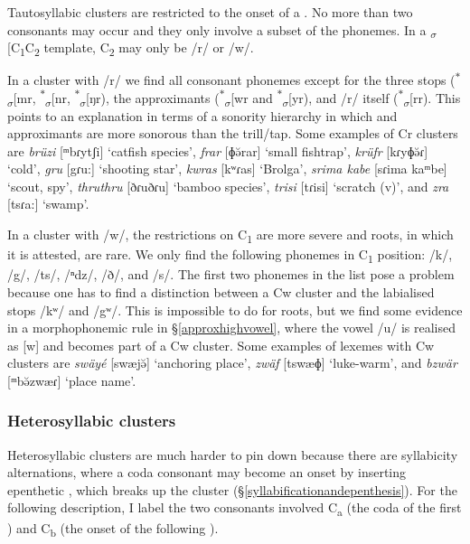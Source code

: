 Tautosyllabic clusters are restricted to the onset of a . No more than two consonants may occur and they only involve a subset of the phonemes. In a \textsubscript{$\sigma$}[C\textsubscript{1}C\textsubscript{2} template, C\textsubscript{2} may only be /r/ or /w/.

In a cluster with /r/ we find all consonant phonemes except for the three  stops (\textsuperscript{$\ast$}\textsubscript{$\sigma$}[mr, \textsuperscript{$\ast$}\textsubscript{$\sigma$}[nr, \textsuperscript{$\ast$}\textsubscript{$\sigma$}[ŋr), the approximants (\textsuperscript{$\ast$}\textsubscript{$\sigma$}[wr and \textsuperscript{$\ast$}\textsubscript{$\sigma$}[yr), and /r/ itself (\textsuperscript{$\ast$}\textsubscript{$\sigma$}[rr). This points to an explanation in terms of a sonority hierarchy in which  and approximants are more sonorous than the trill/tap. Some examples of Cr clusters are \emph{brüzi} [{ᵐ}bɾytʃi] `catfish species', \emph{frar} [ɸə̆rar] `small fishtrap', \emph{krüfr} [kɾyɸə̆ɾ] `cold', \emph{gru} [{\ᵑ}gɾu:] `shooting star', \emph{kwras} [kʷɾas] `Brolga', \emph{srima kabe} [sɾima ka{ᵐ}be] `scout, spy', \emph{thruthru} [ðɾuðɾu] `bamboo species', \emph{trisi} [tɾisi] `scratch (v)', and \emph{zra} [tsɾa:] `swamp'.

In a cluster with /w/, the restrictions on C\textsubscript{1} are more severe and roots, in which it is attested, are rare. We only find the following phonemes in C\textsubscript{1} position: /k/, /{\ᵑ}g/, /ts/, /{ⁿ}dz/, /ð/, and /s/. The first two phonemes in the list pose a problem because one has to find a distinction between a Cw cluster and the labialised  stops /kʷ/ and /{\ᵑ}gʷ/. This is impossible to do for roots, but we find some evidence in a morphophonemic rule in {\S}\ref{approxhighvowel}, where the vowel /u/ is realised as [w] and becomes part of a Cw cluster. Some examples of lexemes with Cw clusters are \emph{swäyé} [swæjə̆] `anchoring place', \emph{zwäf} [tswæɸ] `luke-warm', and \emph{bzwär} [ᵐbə̆zwæɾ] `place name'.

\subsubsection{Heterosyllabic clusters} \label{heterosyllabiccc}

Heterosyllabic clusters are much harder to pin down because there are syllabicity alternations, where a coda consonant may become an onset by inserting epenthetic , which breaks up the cluster ({\S}\ref{syllabificationandepenthesis}). For the following description, I label the two consonants involved C\textsubscript{a} (the coda of the first ) and C\textsubscript{b} (the onset of the following ).

